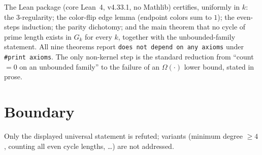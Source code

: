 \documentclass[11pt]{article}
\begin{document}
The Lean package (core Lean~4, v4.33.1, no Mathlib) certifies,
uniformly in $k$: the $3$-regularity; the color-flip edge lemma
(endpoint colors sum to $1$); the even-steps induction; the parity
dichotomy; and the main theorem that no cycle of prime length exists in
$G_k$ for every $k$, together with the unbounded-family statement. All
nine theorems report \texttt{does not depend on any axioms} under
\texttt{\#print axioms}. The only non-kernel step is the standard
reduction from ``count $=0$ on an unbounded family'' to the failure of
an $\Omega(\cdot)$ lower bound, stated in prose.

\section{Boundary}

Only the displayed universal statement is refuted; variants (minimum
degree $\ge 4$, counting all even cycle lengths, \dots) are not
addressed.
\end{document}
